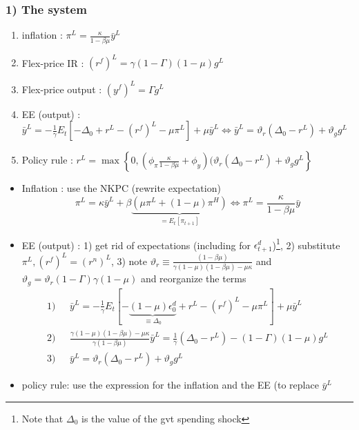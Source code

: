 \documentclass{article}
\begin{document}
\subsubsection{1) The system}
\begin{RecapBox}
    \begin{enumerate}
        \item inflation : $\pi^L =\frac{\kappa}{1-\beta\mu}\bar{y}^L $
        \item Flex-price IR : $(r^f)^L=\gamma(1-\Gamma)(1-\mu)g^L$
        \item Flex-price output : $(y^f)^L=\Gamma g^L$
        \item EE (output) : $\bar{y}^L = -\frac{1}{\gamma}E_t[-\Delta_0+r^L-(r^f)^L-\mu\pi^L] + \mu\bar{y}^L \Longleftrightarrow \bar{y}^L = \vartheta_r(\Delta_0-r^L)+\vartheta_gg^L$
        \item Policy rule : $r^L = \max\left\{ 0,(\phi_\pi\frac{\kappa}{1-\beta\mu}+\phi_y)(\vartheta_r(\Delta_0-r^L)+\vartheta_gg^L\right\}$
    \end{enumerate}
\end{RecapBox}
\begin{itemize}
    \item Inflation : use the NKPC (rewrite expectation)
    \begin{equation}
        \pi^L = \kappa\bar{y}^L + \beta\underbrace{(\mu\pi^L+(1-\mu)\pi^H)}_{=E_t[\pi_{t+1}]} \Longleftrightarrow \pi^L = \frac{\kappa}{1-\beta\mu}\bar{y}
    \end{equation}
    \item EE (output) : 1) get rid of expectations (including for $\epsilon_{t+1}^d$)\footnote{Note that $\Delta_0$ is the value of the gvt spending shock}, 2) substitute $\pi^L,(r^f)^L=(r^n)^L$, 3) note $\vartheta_r\equiv\frac{(1-\beta\mu)}{\gamma(1-\mu)(1-\beta\mu)-\mu\kappa}$ and $\vartheta_g=\vartheta_r(1-\Gamma)\gamma(1-\mu)$ and reorganize the terms 
    \begin{equation}
    \begin{aligned}
        1)&\text{ }\bar{y}^L = -\frac{1}{\gamma}E_t[-\underbrace{(1-\mu)\epsilon_0^d}_{\equiv\Delta_0}+r^L-(r^f)^L-\mu\pi^L] + \mu\bar{y}^L\\
        2)&\text{ } \frac{\gamma(1-\mu)(1-\beta\mu)-\mu\kappa}{\gamma(1-\beta\mu)}\bar{y}^L = \frac{1}{\gamma}(\Delta_0-r^L) - (1-\Gamma)(1-\mu)g^L\\
        3)&\text{ } \bar{y}^L = \vartheta_r(\Delta_0-r^L)+\vartheta_gg^L
    \end{aligned}
    \end{equation}
    \item policy rule: use the expression for the inflation and the EE (to replace $\bar{y}^L$
\end{itemize}
\end{document}
